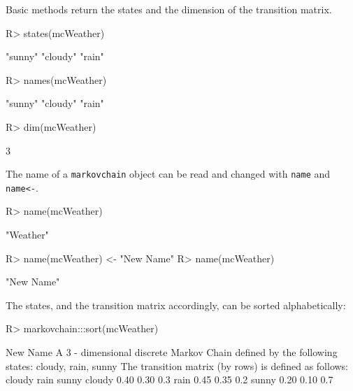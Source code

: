 \documentclass[
  nojss]{jss}
\begin{document}
Basic methods return the states and the dimension of the transition matrix.

\begin{CodeChunk}
\begin{CodeInput}
R> states(mcWeather)
\end{CodeInput}
\begin{CodeOutput}
[1] "sunny"  "cloudy" "rain"  
\end{CodeOutput}
\begin{CodeInput}
R> names(mcWeather)
\end{CodeInput}
\begin{CodeOutput}
[1] "sunny"  "cloudy" "rain"  
\end{CodeOutput}
\begin{CodeInput}
R> dim(mcWeather)
\end{CodeInput}
\begin{CodeOutput}
[1] 3
\end{CodeOutput}
\end{CodeChunk}

The name of a \texttt{markovchain} object can be read and changed with \texttt{name} and \texttt{name\textless{}-}.

\begin{CodeChunk}
\begin{CodeInput}
R> name(mcWeather)
\end{CodeInput}
\begin{CodeOutput}
[1] "Weather"
\end{CodeOutput}
\begin{CodeInput}
R> name(mcWeather) <- "New Name"
R> name(mcWeather)
\end{CodeInput}
\begin{CodeOutput}
[1] "New Name"
\end{CodeOutput}
\end{CodeChunk}

The states, and the transition matrix accordingly, can be sorted alphabetically:

\begin{CodeChunk}
\begin{CodeInput}
R> markovchain:::sort(mcWeather)
\end{CodeInput}
\begin{CodeOutput}
New Name 
 A  3 - dimensional discrete Markov Chain defined by the following states: 
 cloudy, rain, sunny 
 The transition matrix  (by rows)  is defined as follows: 
       cloudy rain sunny
cloudy   0.40 0.30   0.3
rain     0.45 0.35   0.2
sunny    0.20 0.10   0.7
\end{CodeOutput}
\end{CodeChunk}
\end{document}
